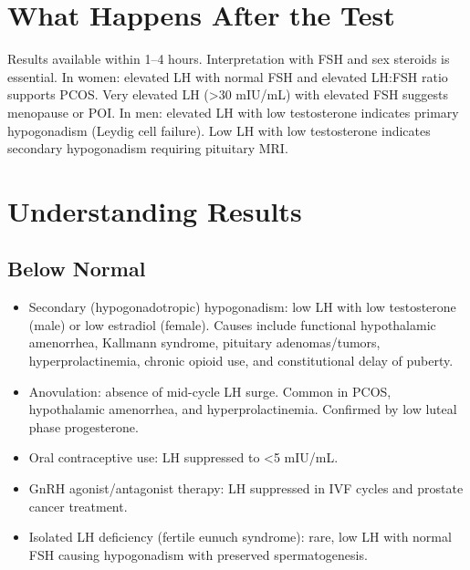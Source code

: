 \section*{What Happens After the Test}
Results available within 1--4 hours. Interpretation with FSH and sex steroids is essential. In women: elevated LH with normal FSH and elevated LH:FSH ratio supports PCOS. Very elevated LH (>30 mIU/mL) with elevated FSH suggests menopause or POI. In men: elevated LH with low testosterone indicates primary hypogonadism (Leydig cell failure). Low LH with low testosterone indicates secondary hypogonadism requiring pituitary MRI.

\section*{Understanding Results}

\subsection*{Below Normal}
\begin{itemize}
  \item Secondary (hypogonadotropic) hypogonadism: low LH with low testosterone (male) or low estradiol (female). Causes include functional hypothalamic amenorrhea, Kallmann syndrome, pituitary adenomas/tumors, hyperprolactinemia, chronic opioid use, and constitutional delay of puberty.
  \item Anovulation: absence of mid-cycle LH surge. Common in PCOS, hypothalamic amenorrhea, and hyperprolactinemia. Confirmed by low luteal phase progesterone.
  \item Oral contraceptive use: LH suppressed to <5 mIU/mL.
  \item GnRH agonist/antagonist therapy: LH suppressed in IVF cycles and prostate cancer treatment.
  \item Isolated LH deficiency (fertile eunuch syndrome): rare, low LH with normal FSH causing hypogonadism with preserved spermatogenesis.
\end{itemize}

